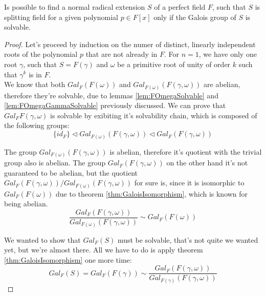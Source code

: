 \begin{theorem}
    Is possible to find a normal radical extension $S$ of a perfect field $F$, 
    such that $S$ is splitting field for a given polynomial $p \in F[x]$ only if the Galois group 
    of $S$ is solvable.
\end{theorem}
\begin{proof}
Let's proceed by induction on the numer of distinct, linearly independent roots
of the polynomial $p$ that are not already in $F$. For $n=1$, we have only one root $\gamma$, 
such that $S=F(\gamma)$ and $\omega$ be a primitive root of unity of order $k$ such that $\gamma^k$
is in $F$. \\

We know that both $Gal_F(F(\omega))$ and $Gal_{F(\omega)}(F(\gamma, \omega))$ are abelian, 
therefore they're solvable, due to lemmas \ref{lem:FOmegaSolvable} and \ref{lem:FOmegaGammaSolvable} previously 
discussed. We can prove that $Gal_F{F(\gamma, \omega)}$ is solvable by exibiting it's solvability chain, 
which is composed of the following groups: \\

$$ \{ id_F \} \triangleleft Gal_{F(\omega)}(F(\gamma, \omega)) \triangleleft Gal_{F}(F(\gamma, \omega)) $$
\vspace{0.2em}

The group $Gal_{F(\omega)}(F(\gamma, \omega))$ is abelian, therefore it's quotient with the trivial group 
also is abelian. The group $Gal_{F}(F(\gamma, \omega))$ on the other hand it's not guaranteed to be abelian, 
but the quotient $Gal_{F}(F(\gamma, \omega)) / Gal_{F(\omega)}(F(\gamma, \omega))$ for sure is, since 
it is isomorphic to $Gal_F(F(\omega))$ due to theorem \ref{thm:GaloisIsomorphism}, which is known 
for being abelian. \\

$$ \frac{Gal_{F}(F(\gamma, \omega))}{Gal_{F(\omega)}(F(\gamma, \omega))} \sim Gal_F(F(\omega)) $$
\vspace{0.2em}

We wanted to show that $Gal_F(S)$ must be solvable, that's not quite we wanted yet, but 
we're almost there. All we have to do is apply theorem \ref{thm:GaloisIsomorphism} one 
more time: \\

$$ Gal_F(S) = Gal_F(F(\gamma)) \sim  \frac{Gal_{F}(F(\gamma, \omega))}{Gal_{F(\gamma)}(F(\gamma, \omega))} $$
\vspace{0.2em}


\end{proof}
